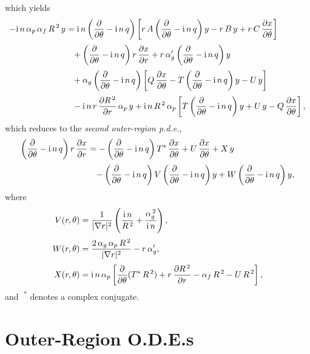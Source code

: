 \documentclass[12pt,prb,aps]{revtex4-1}
\begin{document}
which yields
\begin{align}
-{\rm i}\,n\,\alpha_p\,\alpha_f\,R^{\,2}\,y&={\rm i}\,n\left(\frac{\partial}{\partial\theta}-{\rm i}\,n\,q\right)\left[r\,A\left(\frac{\partial}{\partial \theta}-{\rm i}\,n\,q\right)y-r\,B\,y+r\,C\,\frac{\partial x}{\partial\theta}\right]\nonumber\\[0.5ex]&\phantom= +\left(\frac{\partial}{\partial\theta}-{\rm i}\,n\,q\right)r\,\frac{\partial x}{\partial r}  +r\,\alpha_g'\left(\frac{\partial}{\partial\theta}-{\rm i}\,n\,q\right)y \nonumber\\[0.5ex]
&\phantom{=}+ \alpha_g\left(\frac{\partial}{\partial\theta}-{\rm i}\,n\,q\right)\left[Q\,\frac{\partial x}{\partial\theta}
-T\left(\frac{\partial}{\partial\theta}-{\rm i}\,n\,q\right)y-U\,y\right]\nonumber\\[0.5ex]&\phantom{=}
-{\rm i}\,n\,r\,\frac{\partial R^{\,2}}{\partial r}\,\alpha_p\,y+{\rm i}\,n\,R^{\,2}\,\alpha_p \left[T\left(\frac{\partial}{\partial\theta}-{\rm i}\,n\,q\right)y + U\,y -Q\,\frac{\partial x}{\partial\theta}\right],
\end{align}
which reduces to the {\em second outer-region p.d.e.},\cite{connor}
\begin{align}\label{esecond}
\left(\frac{\partial}{\partial\theta}-{\rm i}\,n\,q\right)r\,\frac{\partial x}{\partial r} &= -\left(\frac{\partial}{\partial\theta}-{\rm i}\,n\,q\right)T^\ast\,\frac{\partial x}{\partial \theta} + U\,\frac{\partial x}{\partial\theta}+X\,y\nonumber\\[0.5ex]&\phantom{=} -\left(\frac{\partial}{\partial\theta}-{\rm i}\,n\,q\right)V\left(\frac{\partial}{\partial\theta}-{\rm i}\,n\,q\right)y + W\left(\frac{\partial}{\partial\theta}-{\rm i}\,n\,q\right)y,
\end{align}
where
\begin{align}
V(r,\theta)&= \frac{1}{|\nabla r|^2}\left(\frac{{\rm i}\,n}{R^{\,2}}+\frac{\alpha_g^{\,2}}{{\rm i}\,n}\right),\label{ev}\\[0.5ex]
W(r,\theta)&= \frac{2\,\alpha_g\,\alpha_p\,R^{\,2}}{|\nabla r|^2} -r\,\alpha_g',\label{ew}\\[0.5ex]
X(r,\theta)&= {\rm i}\,n\,\alpha_p\left[\frac{\partial}{\partial \theta}(T^\ast\,R^{\,2})+r\,\frac{\partial R^{\,2}}{\partial r}-\alpha_f\,R^{\,2}-U\,R^{\,2}\right],\label{ex}
\end{align}
and $\phantom{!}^\ast$ denotes a complex conjugate.

\section{Outer-Region O.D.E.s}\label{sode}
\end{document}
